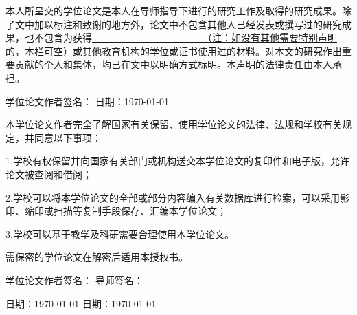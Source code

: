 \begin{titlepage}

\par\vskip30pt
\begin{spacing}{1.5}
\end{spacing}

\par\vskip20pt
本人所呈交的学位论文是本人在导师指导下进行的研究工作及取得的研究成果。除了文中加以标注和致谢的地方外，论文中不包含其他人已经发表或撰写过的研究成果，也不包含为获得\underline{~~~~~~~~~~~~~~~~~~~~~~~（注：如没有其他需要特别声明的，本栏可空）}或其他教育机构的学位或证书使用过的材料。对本文的研究作出重要贡献的个人和集体，均已在文中以明确方式标明。本声明的法律责任由本人承担。

\par\vskip60pt

学位论文作者签名：\hspace*{160pt} 日期：\today

\begin{spacing}{1.5}
\centering{- - - - - - - - - - - - - - - - - - - - - - - - - - - - - - - - - - - - - - - - - - - - - - - - - - - - - - - - - }
\end{spacing}

\begin{spacing}{1.5}
\end{spacing}

\par\vskip20pt
本学位论文作者完全了解国家有关保留、使用学位论文的法律、法规和学校有关规定，并同意以下事项：

1.学校有权保留并向国家有关部门或机构送交本学位论文的复印件和电子版，允许论文被查阅和借阅；

2.学校可以将本学位论文的全部或部分内容编入有关数据库进行检索，可以采用影印、缩印或扫描等复制手段保存、汇编本学位论文；

3.学校可以基于教学及科研需要合理使用本学位论文。

需保密的学位论文在解密后适用本授权书。

\par\vskip60pt
学位论文作者签名：\hspace*{160pt} 导师签名：
\par\vskip20pt
日期：\today \hspace*{135pt} 日期：\today

\end{titlepage}

